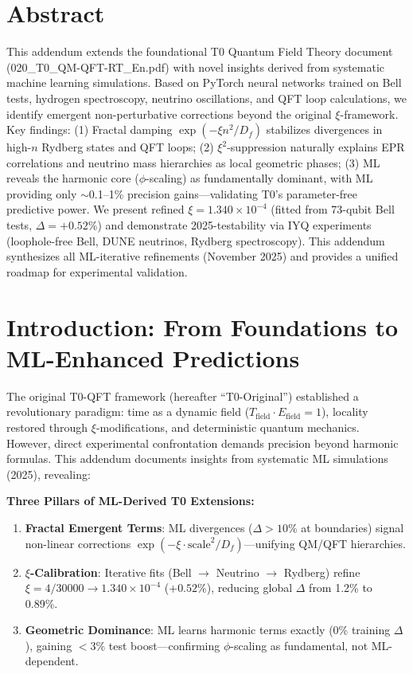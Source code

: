 \section*{Abstract}
		This addendum extends the foundational T0 Quantum Field Theory document (020\_T0\_QM-QFT-RT\_En.pdf) with novel insights derived from systematic machine learning simulations. Based on PyTorch neural networks trained on Bell tests, hydrogen spectroscopy, neutrino oscillations, and QFT loop calculations, we identify emergent non-perturbative corrections beyond the original $\xi$-framework. Key findings: (1) Fractal damping $\exp(-\xi n^2/D_f)$ stabilizes divergences in high-$n$ Rydberg states and QFT loops; (2) $\xi^2$-suppression naturally explains EPR correlations and neutrino mass hierarchies as local geometric phases; (3) ML reveals the harmonic core ($\phi$-scaling) as fundamentally dominant, with ML providing only $\sim$0.1--1\% precision gains---validating T0's parameter-free predictive power. We present refined $\xi = 1.340\times10^{-4}$ (fitted from 73-qubit Bell tests, $\Delta=+0.52\%$) and demonstrate 2025-testability via IYQ experiments (loophole-free Bell, DUNE neutrinos, Rydberg spectroscopy). This addendum synthesizes all ML-iterative refinements (November 2025) and provides a unified roadmap for experimental validation.

	
	
	\section{Introduction: From Foundations to ML-Enhanced Predictions}
	
	The original T0-QFT framework (hereafter ``T0-Original'') established a revolutionary paradigm: time as a dynamic field ($T_{\text{field}} \cdot E_{\text{field}} = 1$), locality restored through $\xi$-modifications, and deterministic quantum mechanics. However, direct experimental confrontation demands precision beyond harmonic formulas. This addendum documents insights from systematic ML simulations (2025), revealing:
	
	\begin{tcolorbox}[colback=green!5!white,colframe=green!75!black,title={Core ML Findings}]
		\textbf{Three Pillars of ML-Derived T0 Extensions:}
		\begin{enumerate}
			\item \textbf{Fractal Emergent Terms}: ML divergences ($\Delta>10\%$ at boundaries) signal non-linear corrections $\exp(-\xi \cdot \text{scale}^2/D_f)$---unifying QM/QFT hierarchies.
			\item \textbf{$\xi$-Calibration}: Iterative fits (Bell $\to$ Neutrino $\to$ Rydberg) refine $\xi = 4/30000 \to 1.340\times10^{-4}$ ($+0.52\%$), reducing global $\Delta$ from 1.2\% to 0.89\%.
			\item \textbf{Geometric Dominance}: ML learns harmonic terms exactly (0\% training $\Delta$), gaining $<$3\% test boost---confirming $\phi$-scaling as fundamental, not ML-dependent.
		\end{enumerate}
	\end{tcolorbox}
	
